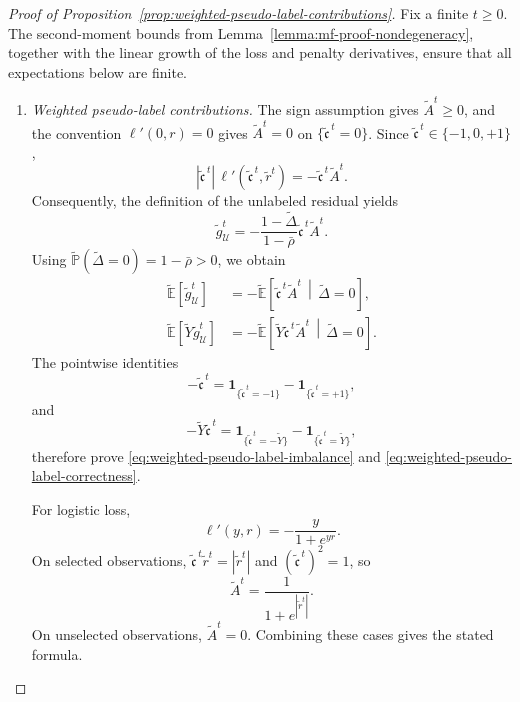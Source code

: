 \begin{proof}[Proof of Proposition~\ref{prop:weighted-pseudo-label-contributions}]
Fix a finite $t\geq0$.
The second-moment bounds from
Lemma~\ref{lemma:mf-proof-nondegeneracy}, together with the
linear growth of the loss and penalty derivatives, ensure
that all expectations below are finite.

\begin{enumerate}[label=(\roman*),wide]
    \item \emph{Weighted pseudo-label contributions.}
    The sign assumption gives $\tilde A^t\geq0$, and the
    convention $\ell'(0,r)=0$ gives $\tilde A^t=0$ on
    $\{\tilde{\mathfrak c}^{\,t}=0\}$.
    Since $\tilde{\mathfrak c}^{\,t}\in\{-1,0,+1\}$,
    \[
        |\tilde{\mathfrak c}^{\,t}|\,
        \ell'(\tilde{\mathfrak c}^{\,t},\tilde r^t)
        =
        -\tilde{\mathfrak c}^{\,t}\tilde A^t.
    \]
    Consequently, the definition of the unlabeled residual
    yields
    \[
        \tilde g_{\mathcal U}^t
        =
        -\frac{1-\tilde\Delta}{1-\bar\rho}
            \tilde{\mathfrak c}^{\,t}\tilde A^t.
    \]
    Using
    $\tilde{\mathbb P}(\tilde\Delta=0)=1-\bar\rho>0$,
    we obtain
    \[
    \begin{aligned}
        \tilde{\mathbb E}[\tilde g_{\mathcal U}^t]
        &=
        -\tilde{\mathbb E}\left[
            \tilde{\mathfrak c}^{\,t}\tilde A^t
            \,\middle|\,\tilde\Delta=0
        \right],\\
        \tilde{\mathbb E}[\tilde Y\tilde g_{\mathcal U}^t]
        &=
        -\tilde{\mathbb E}\left[
            \tilde Y\tilde{\mathfrak c}^{\,t}\tilde A^t
            \,\middle|\,\tilde\Delta=0
        \right].
    \end{aligned}
    \]
    The pointwise identities
    \[
        -\tilde{\mathfrak c}^{\,t}
        =
        \mathbf1_{\{\tilde{\mathfrak c}^{\,t}=-1\}}
        -
        \mathbf1_{\{\tilde{\mathfrak c}^{\,t}=+1\}},
    \]
    and
    \[
        -\tilde Y\tilde{\mathfrak c}^{\,t}
        =
        \mathbf1_{\{\tilde{\mathfrak c}^{\,t}=-\tilde Y\}}
        -
        \mathbf1_{\{\tilde{\mathfrak c}^{\,t}=\tilde Y\}},
    \]
    therefore prove
    \eqref{eq:weighted-pseudo-label-imbalance}
    and \eqref{eq:weighted-pseudo-label-correctness}.

    For logistic loss,
    \[
        \ell'(y,r)=-\frac{y}{1+e^{yr}}.
    \]
    On selected observations,
    $\tilde{\mathfrak c}^{\,t}\tilde r^t=|\tilde r^t|$
    and $(\tilde{\mathfrak c}^{\,t})^2=1$, so
    \[
        \tilde A^t
        =
        \frac{1}{1+e^{|\tilde r^t|}}.
    \]
    On unselected observations, $\tilde A^t=0$.
    Combining these cases gives the stated formula.


\end{enumerate}
\end{proof}
